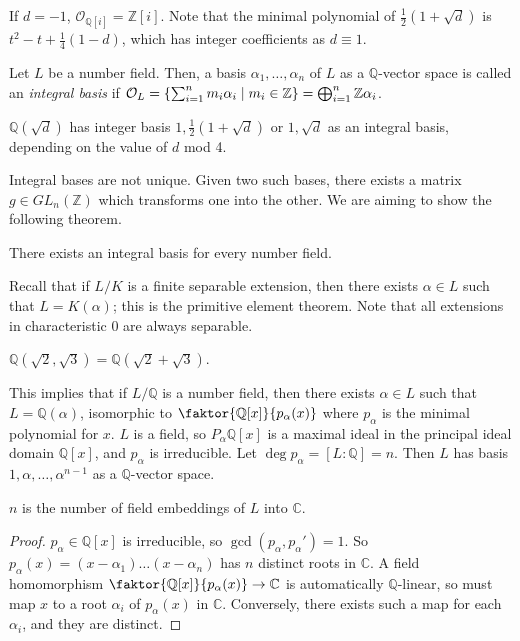 \begin{example}
    If \( d = -1 \), \( \mathcal O_{\mathbb Q[i]} = \mathbb Z[i] \).
    Note that the minimal polynomial of \( \frac{1}{2}(1+\sqrt d) \) is \( t^2 - t + \frac{1}{4}(1-d) \), which has integer coefficients as \( d \equiv 1 \).
\end{example}
\begin{definition}
    Let \( L \) be a number field.
    Then, a basis \( \alpha_1, \dots, \alpha_n \) of \( L \) as a \( \mathbb Q \)-vector space is called an \emph{integral basis} if \( \mathcal O_L = \qty{\sum_{i=1}^n m_i \alpha_i \mid m_i \in \mathbb Z} = \bigoplus_{i=1}^n \mathbb Z \alpha_i \).
\end{definition}
\begin{example}
    \( \mathbb Q(\sqrt d) \) has integer basis \( 1, \frac{1}{2}(1+\sqrt d) \) or \( 1, \sqrt d \) as an integral basis, depending on the value of \( d \) mod 4.
\end{example}
Integral bases are not unique.
Given two such bases, there exists a matrix \( g \in GL_n(\mathbb Z) \) which transforms one into the other.
We are aiming to show the following theorem.
\begin{theorem}
    There exists an integral basis for every number field.
\end{theorem}
Recall that if \( L / K \) is a finite separable extension, then there exists \( \alpha \in L \) such that \( L = K(\alpha) \); this is the primitive element theorem.
Note that all extensions in characteristic 0 are always separable.
\begin{example}
    \( \mathbb Q(\sqrt 2, \sqrt 3) = \mathbb Q(\sqrt 2 + \sqrt 3) \).
\end{example}
This implies that if \( L / \mathbb Q \) is a number field, then there exists \( \alpha \in L \) such that \( L = \mathbb Q(\alpha) \), isomorphic to \( \faktor{\mathbb Q[x]}{p_\alpha(x)} \) where \( p_\alpha \) is the minimal polynomial for \( x \).
\( L \) is a field, so \( P_\alpha \mathbb Q[x] \) is a maximal ideal in the principal ideal domain \( \mathbb Q[x] \), and \( p_\alpha \) is irreducible.
Let \( \deg p_\alpha = [L:\mathbb Q] = n \).
Then \( L \) has basis \( 1, \alpha, \dots, \alpha^{n-1} \) as a \( \mathbb Q \)-vector space.
\begin{lemma}
    \( n \) is the number of field embeddings of \( L \) into \( \mathbb C \).
\end{lemma}
\begin{proof}
    \( p_\alpha \in \mathbb Q[x] \) is irreducible, so \( \gcd(p_\alpha, p_\alpha') = 1 \).
    So \( p_\alpha(x) = (x-\alpha_1)\dots(x-\alpha_n) \) has \( n \) distinct roots in \( \mathbb C \).
    A field homomorphism \( \faktor{\mathbb Q[x]}{p_\alpha(x)} \to \mathbb C \) is automatically \( \mathbb Q \)-linear, so must map \( x \) to a root \( \alpha_i \) of \( p_\alpha(x) \) in \( \mathbb C \).
    Conversely, there exists such a map for each \( \alpha_i \), and they are distinct.
\end{proof}
